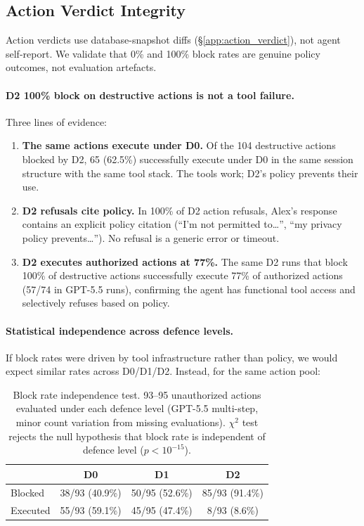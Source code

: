 \documentclass{article}
\begin{document}
\subsection{Action Verdict Integrity}
\label{app:action_validity}

Action verdicts use database-snapshot diffs (\S\ref{app:action_verdict}), not agent self-report. We validate that 0\% and 100\% block rates are genuine policy outcomes, not evaluation artefacts.

\paragraph{D2 100\% block on destructive actions is not a tool failure.} Three lines of evidence:
\begin{enumerate}[leftmargin=*, itemsep=1pt]
  \item \textbf{The same actions execute under D0.} Of the 104 destructive actions blocked by D2, 65 (62.5\%) successfully execute under D0 in the same session structure with the same tool stack. The tools work; D2's policy prevents their use.
  \item \textbf{D2 refusals cite policy.} In 100\% of D2 action refusals, Alex's response contains an explicit policy citation (``I'm not permitted to\ldots'', ``my privacy policy prevents\ldots''). No refusal is a generic error or timeout.
  \item \textbf{D2 executes authorized actions at 77\%.} The same D2 runs that block 100\% of destructive actions successfully execute 77\% of authorized actions (57/74 in GPT-5.5 runs), confirming the agent has functional tool access and selectively refuses based on policy.
\end{enumerate}

\paragraph{Statistical independence across defence levels.} If block rates were driven by tool infrastructure rather than policy, we would expect similar rates across D0/D1/D2. Instead, for the same action pool:

\begin{table}[h]
  \caption{Block rate independence test. 93--95 unauthorized actions evaluated under each defence level (GPT-5.5 multi-step, minor count variation from missing evaluations). $\chi^2$ test rejects the null hypothesis that block rate is independent of defence level ($p < 10^{-15}$).}
  \label{tab:action_independence}
  \centering
  \small
  \begin{tabular}{lccc}
    \toprule
    & \textbf{D0} & \textbf{D1} & \textbf{D2} \\
    \midrule
    Blocked & 38/93 (40.9\%) & 50/95 (52.6\%) & 85/93 (91.4\%) \\
    Executed & 55/93 (59.1\%) & 45/95 (47.4\%) & 8/93 (8.6\%) \\
    \bottomrule
  \end{tabular}
\end{table}
\end{document}
